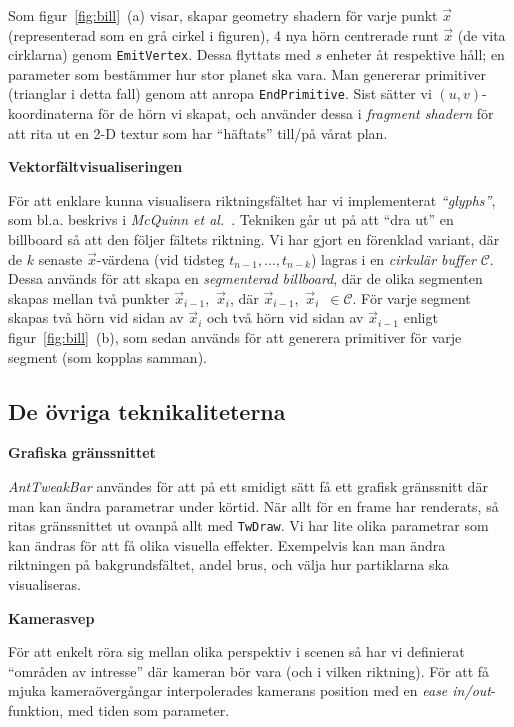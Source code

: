 \documentclass[a4paper]{article}
\begin{document}
\begin{multicols}{2}
Som figur~\ref{fig:bill}~(a) visar, skapar geometry shadern för varje punkt \(\vec{x}\) (representerad som en grå cirkel i figuren), 4 nya hörn centrerade runt \(\vec{x}\) (de vita cirklarna) genom \texttt{EmitVertex}. Dessa flyttats med \(s\) enheter åt respektive håll; en parameter som bestämmer hur stor planet ska vara. Man genererar primitiver (trianglar i detta fall) genom att anropa \texttt{EndPrimitive}. Sist sätter vi \((u, v)\)-koordinaterna för de hörn vi skapat, och använder dessa i \emph{fragment shadern} för att rita ut en 2-D textur som har ``häftats'' till/på vårat plan.

\textbf{Vektorfältvisualiseringen}

För att enklare kunna visualisera riktningsfältet har vi implementerat \emph{``glyphs''}, som bl.a. beskrivs i \emph{McQuinn et al.}~\cite{mcquinn2013glyphsea}. Tekniken går ut på att ``dra ut'' en billboard så att den följer fältets riktning. Vi har gjort en förenklad variant, där de \(k\) senaste \(\vec{x}\)-värdena (vid tidsteg \(t_{n-1}, ..., t_{n-k}\)) lagras i en \emph{cirkulär buffer} \(\mathcal{C}\). Dessa används för att skapa en \emph{segmenterad billboard}, där de olika segmenten skapas mellan två punkter \(\vec{x}_{i-1}\),~\(\vec{x}_i\), där \(\vec{x}_{i-1}\),~\(\vec{x}_i\)~\(\in \mathcal{C}\). För varje segment skapas två hörn vid sidan av \(\vec{x}_i\) och två hörn vid sidan av \(\vec{x}_{i-1}\) enligt figur~\ref{fig:bill}~(b), som sedan används för att generera primitiver för varje segment (som kopplas samman).

\subsection{De övriga teknikaliteterna}

\textbf{Grafiska gränssnittet}

\textit{AntTweakBar} användes för att på ett smidigt sätt få ett grafisk gränssnitt där man kan ändra parametrar under körtid. När allt för en frame har renderats, så ritas gränssnittet ut ovanpå allt med \texttt{TwDraw}. Vi har lite olika parametrar som kan ändras för att få olika visuella effekter. Exempelvis kan man ändra riktningen på bakgrundsfältet, andel brus, och välja hur partiklarna ska visualiseras.

\textbf{Kamerasvep}

För att enkelt röra sig mellan olika perspektiv i scenen så har vi definierat ``områden av intresse'' där kameran bör vara (och i vilken riktning).  För att få mjuka kameraövergångar interpolerades kamerans position med en \emph{ease in/out}-funktion, med tiden som parameter.


\end{multicols}
\end{document}
